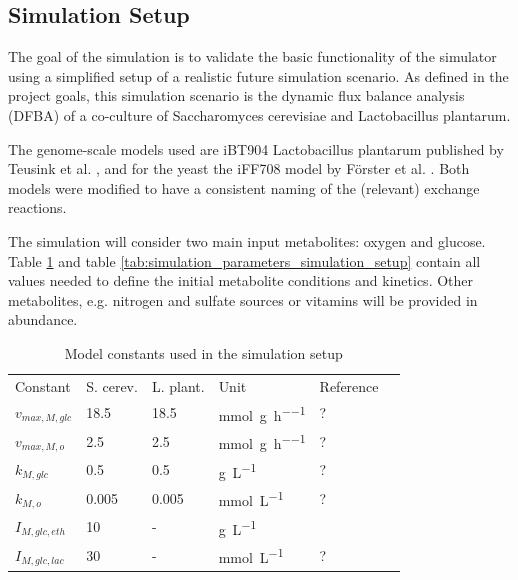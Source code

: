 \subsection{Simulation Setup}\label{ssec:simulation_setup}

The goal of the simulation is to validate the basic functionality of the simulator using a simplified setup of a realistic future
simulation scenario. As defined in the project goals, this simulation scenario is the dynamic flux balance analysis (DFBA) of a
co-culture of Saccharomyces cerevisiae and Lactobacillus plantarum.

The genome-scale models used are iBT904 Lactobacillus plantarum published by Teusink et al. \cite{teusink_analysis_2006},
and for the yeast the iFF708 model by Förster et al. \cite{Foerster01022003}.
Both models were modified to have a consistent naming of the (relevant) exchange reactions.

The simulation will consider two main input metabolites: oxygen and glucose. Table \ref{tab:model_constants_simulation_setup} and table
\ref{tab:simulation_parameters_simulation_setup} contain all values needed to define the initial metabolite conditions and kinetics.
Other metabolites, e.g. nitrogen and sulfate sources or vitamins will be provided in abundance.

\begin{table}[h]
\centering
\caption{Model constants used in the simulation setup}
\label{tab:model_constants_simulation_setup}
\begin{tabular}{llllll}
\rowcolor[HTML]{EFEFEF} 
\cellcolor[HTML]{EFEFEF}Constant & \cellcolor[HTML]{EFEFEF}S. cerev. & \cellcolor[HTML]{EFEFEF}L. plant. & Unit & Reference\\
$v_{max,M,glc}$          &  18.5 &  18.5 & \si{\milli\mole\per\gram\per\hour} & ? \\
$v_{max,M,o}$            &   2.5 &   2.5 & \si{\milli\mole\per\gram\per\hour} & ? \\
$k_{M,glc}$              &   0.5 &   0.5 & \si{\gram\per\liter} & ?  \\
$k_{M,o}$                & 0.005 & 0.005 & \si{\milli\mole\per\liter} & ?  \\
$I_{M,glc,eth}$          & 10 & - & \si{\gram\per\liter} & \cite{hjersted_genome-scale_2007} \\
$I_{M,glc,lac}$          & 30 & -  & \si{\milli\mole\per\liter} & ? \\
\end{tabular}
\end{table}

